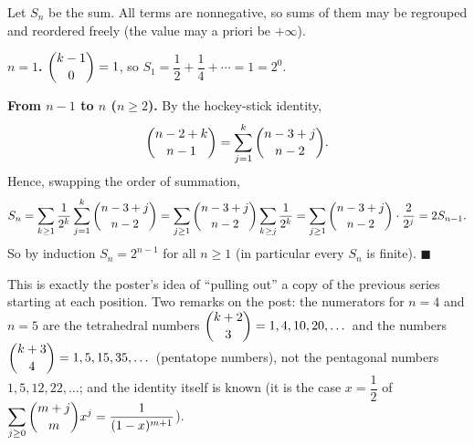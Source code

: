 Let $S_n$ be the sum. All terms are nonnegative, so sums of them may be regrouped and reordered freely (the value may a priori be $+\infty$).

\textbf{$n=1$.} $\dbinom{k-1}{0}=1$, so $S_1=\dfrac12+\dfrac14+\cdots=1=2^0$.

\textbf{From $n-1$ to $n$ ($n\ge2$).} By the hockey-stick identity,
\[\dbinom{n-2+k}{n-1}=\sum_{j=1}^{k}\dbinom{n-3+j}{n-2}.\]
Hence, swapping the order of summation,
\[S_n=\sum_{k\ge1}\dfrac{1}{2^k}\sum_{j=1}^{k}\dbinom{n-3+j}{n-2}=\sum_{j\ge1}\dbinom{n-3+j}{n-2}\sum_{k\ge j}\dfrac{1}{2^k}=\sum_{j\ge1}\dbinom{n-3+j}{n-2}\cdot\dfrac{2}{2^j}=2S_{n-1}.\]
So by induction $S_n=2^{n-1}$ for all $n\ge1$ (in particular every $S_n$ is finite). $\blacksquare$

This is exactly the poster's idea of ``pulling out'' a copy of the previous series starting at each position. Two remarks on the post: the numerators for $n=4$ and $n=5$ are the tetrahedral numbers $\dbinom{k+2}{3}=1,4,10,20,\dots$ and the numbers $\dbinom{k+3}{4}=1,5,15,35,\dots$ (pentatope numbers), not the pentagonal numbers $1,5,12,22,\dots$; and the identity itself is known (it is the case $x=\dfrac12$ of $\displaystyle\sum_{j\ge0}\dbinom{m+j}{m}x^j=\dfrac{1}{(1-x)^{m+1}}$).
